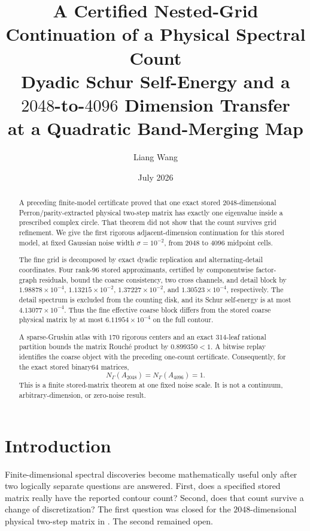 \documentclass[11pt]{article}
\title{A Certified Nested-Grid Continuation of a Physical Spectral Count\\
\large Dyadic Schur Self-Energy and a \(2048\)-to-\(4096\) Dimension Transfer\\
at a Quadratic Band-Merging Map}
\author{Liang Wang}
\date{July 2026}
\theoremstyle{definition}
\theoremstyle{remark}
\begin{document}
\maketitle

\begin{abstract}
A preceding finite-model certificate proved that one exact stored
\(2048\)-dimensional Perron/parity-extracted physical two-step matrix has
exactly one eigenvalue inside a prescribed complex circle.  That theorem did
not show that the count survives grid refinement.  We give the first rigorous
adjacent-dimension continuation for this stored model, at fixed Gaussian noise
width \(\sigma=10^{-2}\), from \(2048\) to \(4096\) midpoint cells.

The fine grid is decomposed by exact dyadic replication and alternating-detail
coordinates.  Four rank-\(96\) stored approximants, certified by componentwise
factor-graph residuals, bound the coarse consistency, two cross channels, and
detail block by \(1.98878\times10^{-4}\), \(1.13215\times10^{-2}\),
\(1.37227\times10^{-2}\), and \(1.30523\times10^{-4}\), respectively.
The detail spectrum is excluded from the counting disk, and its Schur
self-energy is at most \(4.13077\times10^{-4}\).  Thus the fine effective
coarse block differs from the stored coarse physical matrix by at most
\(6.11954\times10^{-4}\) on the full contour.

A sparse-Grushin atlas with \(170\) rigorous centers and an exact
\(314\)-leaf rational partition bounds the matrix Rouch\'e product by
\(0.899350<1\).  A bitwise replay identifies the coarse object with the
preceding one-count certificate.  Consequently, for the exact stored
binary64 matrices,
\[
 \boxed{N_{\Gamma}(A_{2048})=N_{\Gamma}(A_{4096})=1.}
\]
This is a finite stored-matrix theorem at one fixed noise scale.  It is not a
continuum, arbitrary-dimension, or zero-noise result.
\end{abstract}

\section{Introduction}

Finite-dimensional spectral discoveries become mathematically useful only
after two logically separate questions are answered.  First, does a specified
stored matrix really have the reported contour count?  Second, does that count
survive a change of discretization?  The first question was closed for the
\(2048\)-dimensional physical two-step matrix in
\citet{WangPacketPair2026}.  The second remained open.
\end{document}
